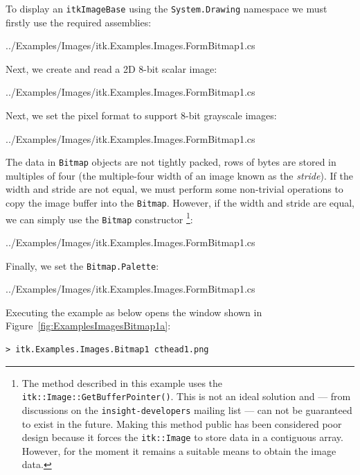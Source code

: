 \documentclass{InsightArticle}
\def\code#1{\texttt{#1}}
\begin{document}
To display an \code{itkImageBase} using the \code{System.Drawing} namespace
we must firstly use the required assemblies:
\begin{center}
	
	{../Examples/Images/itk.Examples.Images.FormBitmap1.cs}
\end{center}

Next, we create and read a 2D 8-bit scalar image:
\begin{center}
	
	{../Examples/Images/itk.Examples.Images.FormBitmap1.cs}
\end{center}

Next, we set the pixel format to support 8-bit grayscale images:
\begin{center}
	
	{../Examples/Images/itk.Examples.Images.FormBitmap1.cs}
\end{center}

The data in \code{Bitmap} objects are not tightly packed,
rows of bytes are stored in multiples of four (the multiple-four width of 
an image known as the \emph{stride}).
If the width and stride are not equal, we must perform some non-trivial
operations to copy the image buffer into the \code{Bitmap}. However,
if the width and stride are equal, we can simply use the \code{Bitmap}
constructor%
\footnote{The method described in this example uses the 
\code{itk::Image::GetBufferPointer()}.
This is not an ideal solution and --- from discussions on the
\code{insight-developers} mailing list ---
can not be guaranteed to exist in the future.
Making this method public has been considered poor design
because it forces the \code{itk::Image} to store data in a
contiguous array.
However, for the moment it remains a suitable means to obtain
the image data.}:
\begin{center}
	
	{../Examples/Images/itk.Examples.Images.FormBitmap1.cs}
\end{center}

Finally, we set the \code{Bitmap.Palette}:
\begin{center}
	
	{../Examples/Images/itk.Examples.Images.FormBitmap1.cs}
\end{center}

Executing the example as below opens the window shown in Figure~\ref{fig:ExamplesImagesBitmap1a}:
\begin{lstlisting}
> itk.Examples.Images.Bitmap1 cthead1.png
\end{lstlisting}
\end{document}
